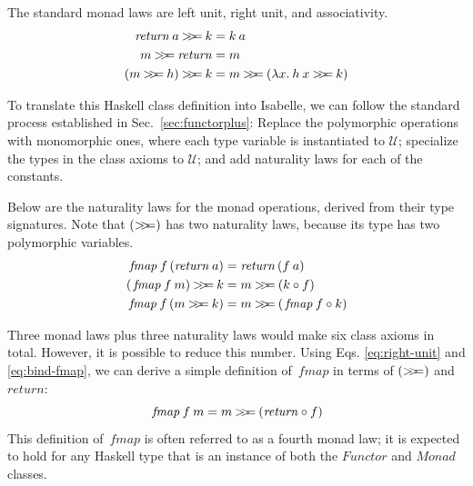 \documentclass{sigplanconf}
\newcommand{\hsbind}{\mathbin{>\mkern-6mu>\mkern-6.5mu=}}
\newcommand{\U}{\ensuremath{\mathcal{U}}}
\newcommand{\hsc}[1]{\ensuremath{\mathit{#1}}}
\newcommand{\fmap}{\,\hsc{fmap}} %
\theoremstyle{definition}
\begin{document}
\noindent
The standard monad laws are left unit, right unit, and associativity.
%
\begin{align}
\label{eq:left-unit}
\hsc{return}\:{a}\hsbind{k} &= {k}\:{a} \\
\label{eq:right-unit}
{m}\hsbind\hsc{return} &= {m} \\
\label{eq:bind-bind}
({m}\hsbind{h})\hsbind{k}&={m}\hsbind(\lambda{x}.\:{h}\:{x}\hsbind{k})
\end{align}

To translate this Haskell class definition into Isabelle, we can follow the standard process established in Sec.~\ref{sec:functorplus}: Replace the polymorphic operations with monomorphic ones, where each type variable is instantiated to $\U$; specialize the types in the class axioms to $\U$; and add naturality laws for each of the constants.

Below are the naturality laws for the monad operations, derived from their type signatures. Note that $(\hsbind)$ has two naturality laws, because its type has two polymorphic variables.
%
\begin{align}
\label{eq:fmap-return}
\fmap\:f\,(\hsc{return}\:a) &= \hsc{return}\,(f\:a) \\
\label{eq:bind-fmap}
(\fmap\:f\:m) \hsbind k &= m \hsbind (k \circ f) \\
\label{eq:fmap-bind}
\fmap\:f\,(m \hsbind k) &= m \hsbind (\fmap\:f \circ k)
\end{align}

Three monad laws plus three naturality laws would make six class axioms in total. However, it is possible to reduce this number. Using Eqs. \eqref{eq:right-unit} and \eqref{eq:bind-fmap}, we can derive a simple definition of $\fmap$ in terms of $(\hsbind)$ and \hsc{return}:
%
\begin{equation}
\label{eq:monad-fmap}
\fmap\:f\:m = m \hsbind (\hsc{return} \circ f)
\end{equation}
%
This definition of $\fmap$ is often referred to as a fourth monad law; it is expected to hold for any Haskell type that is an instance of both the \hsc{Functor} and \hsc{Monad} classes.
\end{document}
